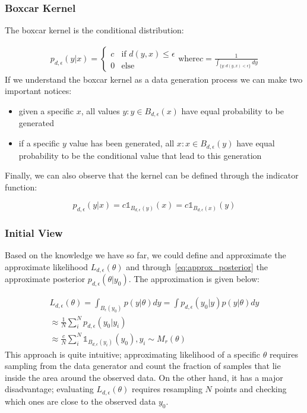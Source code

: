 \subsubsection*{Boxcar Kernel}

The boxcar kernel is the conditional distribution:

\begin{gather}
  p_{d,\epsilon}(y|x) = \left\{
	\begin{array}{ll}
		c  & \mbox{if } d(y,x) \leq \epsilon \\
		0 & \mbox{else } 
	\end{array}
  \right. \text{where} c = \frac{1}{\int_{ \{ y: d(y,x) < \epsilon \} } dy}
\end{gather}
%
If we understand the boxcar kernel as a data generation process we can make two important notices:

\begin{itemize}
\item given a specific $x$, all values $y: y \in B_{d,\epsilon}(x)$ have equal probability to be generated
  \item if a specific $y$ value has been generated, all $x: x \in B_{d,\epsilon}(y)$ have equal probability to be the conditional value that lead to this generation
  \end{itemize}
%
Finally, we can also observe that the kernel can be defined through the indicator function:

\begin{equation}
  p_{d,\epsilon}(y|x) = c \mathbb{1}_{B_{d,\epsilon}(y)}(x) = c \mathbb{1}_{B_{d,\epsilon}(x)}(y)
\end{equation}

\subsubsection*{Initial View}

Based on the knowledge we have so far, we could define and approximate the approximate likelihood $L_{d,\epsilon}(\theta)$ and through~\ref{eq:approx_posterior} the approximate posterior $p_{d, \epsilon}(\theta|y_0)$. The approximation is given below:

\begin{gather} \label{eq:primal_view}
  L_{d, \epsilon}(\theta)=\int_{B_\epsilon(y_0)}p(y|\theta)dy = \int p_{d,\epsilon}(y_0|y)p(y|\theta)dy\\
  \approx \frac{1}{N} \sum_i^N p_{d,\epsilon} (y_0|y_i) \\
  \approx \frac{c}{N} \sum_i^N \mathbb{1}_{B_{d,\epsilon}(y_i)} (y_0), y_i \sim M_r(\theta)
\end{gather}
%
This approach is quite intuitive; approximating likelihood of a specific $\theta$ requires sampling from the data generator and count the fraction of samples that lie inside the area around the observed data. On the other hand, it has a major disadvantage; evaluating $L_{d,\epsilon}(\theta)$ requires resampling $N$ points and checking which ones are close to the observed data $y_0$.

